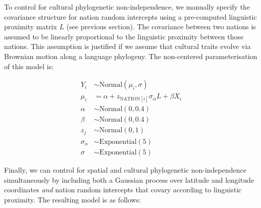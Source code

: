 \documentclass[english,man,floatsintext]{apa6}
\begin{document}
\newpage

To control for cultural phylogenetic non-independence, we manually specify the covariance structure for nation random intercepts using a pre-computed linguistic proximity matrix \(L\) (see previous section). The covariance between two nations is assumed to be linearly proportional to the linguistic proximity between those nations. This assumption is justified if we assume that cultural traits evolve via Brownian motion along a language phylogeny. The non-centered parameterisation of this model is:

\[
\begin{aligned}
Y_{i} &\sim \text{Normal}(\mu_{i},\sigma) \\
\mu_{i} &= \alpha + z_{\text{NATION}[i]}\sigma_{\alpha}L + \beta X_{i} \\
\alpha &\sim \text{Normal}(0, 0.4) \\
\beta &\sim \text{Normal}(0, 0.4) \\
z_{j} &\sim \text{Normal}(0, 1)\\
\sigma_{\alpha} &\sim \text{Exponential}(5) \\
\sigma &\sim \text{Exponential}(5)
\end{aligned}
\]
\newpage

Finally, we can control for spatial and cultural phylogenetic non-independence simultaneously by including both a Gaussian process over latitude and longitude coordinates \emph{and} nation random intercepts that covary according to linguistic proximity. The resulting model is as follows:
\end{document}
